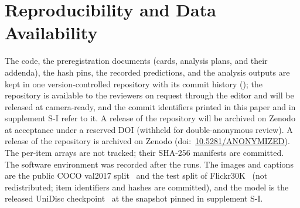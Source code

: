
\section*{Reproducibility and Data Availability}
The code, the preregistration documents (cards, analysis plans, and their addenda), the hash pins, the recorded predictions, and the
analysis outputs are kept in one version-controlled repository with its commit history
();
\ifanon the repository is available to the reviewers on request through the editor and will
be released at camera-ready, and \fi
the commit identifiers printed in this paper and in supplement S-I refer to it.
\ifanon A release of the repository will be archived on Zenodo at acceptance under a reserved DOI (withheld for double-anonymous
review). \else A release of the repository is archived on Zenodo
(doi:~\href{https://doi.org/10.5281/ANONYMIZED}{10.5281/ANONYMIZED}). \fi
The per-item arrays are not tracked; their SHA-256 manifests are committed.
The software environment was recorded after the runs.
The images and captions are the public COCO val2017 split~\cite{lin2014coco} and the test split of Flickr30K~\cite{young2014flickr30k}
(not redistributed; item identifiers and hashes are committed), and the model is the released UniDisc
checkpoint~\cite{swerdlow2025unidisc} at the snapshot pinned in supplement S-I.
